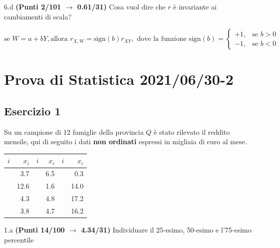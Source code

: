 \documentclass[
  11pt,
]{book}
\theoremstyle{mytheoremstyle}
\theoremstyle{mydefstyle}
\newenvironment{sol}
  {
  \begin{tcolorbox}[enhanced,breakable,arc=0.1mm,boxrule=1pt,colback=white,colframe=iblue,
  title=\bf \fontfamily{lmss}\selectfont \hspace{.5 cm} Soluzione,drop fuzzy shadow]

}{
\end{tcolorbox}
  }
\begin{document}
6.d \textbf{(Punti 2/101 \(\rightarrow\) 0.61/31)} Cosa vuol dire che \(r\) è invariante ai cambiamenti di scala?

\begin{sol}
\[\text{se }W=a+bY,\text{allora }r_{X,W}=\text{sign}(b) r_{XY},\text{ dove la funzione sign}(b)=
\begin{cases}+1, &\text{se $b>0$}\\
             -1, &\text{se $b<0$}
\end{cases}\]

\end{sol}

\section{Prova di Statistica 2021/06/30-2}\label{prova-di-statistica-20210630-2}

\subsection{Esercizio 1}\label{esercizio-1-6}

Su un campione di \(12\) famiglie della provincia \(Q\) è stato rilevato il reddito mensile, qui di seguito i dati \textbf{non ordinati} espressi in migliaia di euro al mese.

\begin{table}[H]
\centering
\begin{tabular}{>{\raggedright\arraybackslash}p{3em}r>{\raggedright\arraybackslash}p{3em}r>{\raggedright\arraybackslash}p{3em}r}
\toprule
$i$ & $x_{i}$ & $i$ & $x_{i}$ & $i$ & $x_{i}$\\
\midrule
\cellcolor[HTML]{E6E6E6}{$1$} & 3.7 & \cellcolor[HTML]{E6E6E6}{$5$} & 6.5 & \cellcolor[HTML]{E6E6E6}{$9$} & 0.3\\
\cellcolor[HTML]{E6E6E6}{$2$} & 12.6 & \cellcolor[HTML]{E6E6E6}{$6$} & 1.6 & \cellcolor[HTML]{E6E6E6}{$10$} & 14.0\\
\cellcolor[HTML]{E6E6E6}{$3$} & 4.3 & \cellcolor[HTML]{E6E6E6}{$7$} & 4.8 & \cellcolor[HTML]{E6E6E6}{$11$} & 17.2\\
\cellcolor[HTML]{E6E6E6}{$4$} & 3.8 & \cellcolor[HTML]{E6E6E6}{$8$} & 4.7 & \cellcolor[HTML]{E6E6E6}{$12$} & 16.2\\
\bottomrule
\end{tabular}
\end{table}

1.a \textbf{(Punti 14/100 \(\rightarrow\) 4.34/31)} Individuare il 25-esimo, 50-esimo e l'75-esimo percentile
\end{document}
